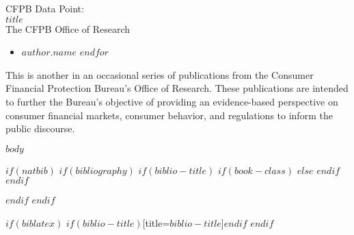 \documentclass[12pt,letterpaper,twoside]{article}
\begin{document}
\begin{titlepage}
  \thispagestyle{fancy}
  \vspace*{1.5in}
  {\color{white}  \fontsize{38}{38} \selectfont CFPB Data Point:\\[25pt]
  $title$\\[40pt]
  \fontsize{14}{14} \selectfont The CFPB Office of Research\par}
\end{titlepage}

\fancyfoot[R]{}
\begin{itemize}     %
 \renewcommand{\labelitemi}{\scriptsize\FilledSmallSquare}
  $for(author)$
    \item $author.name$
  $endfor$
\end{itemize}

This is another in an occasional series of publications from the Consumer Financial Protection Bureau's Office of Research. These publications are intended to further the Bureau's objective of providing an evidence-based perspective on consumer financial markets, consumer behavior, and regulations to inform the public discourse.
\newpage

\vspace*{1.5in}
\tableofcontents
\thispagestyle{fancy}

\newpage


$body$

$if(natbib)$
$if(bibliography)$
$if(biblio-title)$
$if(book-class)$
\renewcommand\bibname{$biblio-title$}
$else$
\renewcommand\refname{$biblio-title$}
$endif$
$endif$

$endif$
$endif$

$if(biblatex)$
\printbibliography$if(biblio-title)$[title=$biblio-title$]$endif$
$endif$
\end{document}
